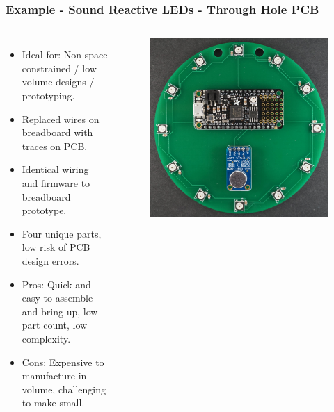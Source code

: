 \documentclass[aspectratio=169, t]{beamer}
\begin{document}
\begin{frame}
\frametitle{Example - Sound Reactive LEDs - Through Hole PCB}
\vspace{-5mm}
\begin{columns}
	\begin{itemize}
		\item Ideal for: Non space constrained / low volume designs / prototyping.
		\item Replaced wires on breadboard with traces on PCB.
		\item Identical wiring and firmware to breadboard prototype.
		\item Four unique parts, low risk of PCB design errors.
		\item Pros: Quick and easy to assemble and bring up, low part count, low complexity.
		\item Cons: Expensive to manufacture in volume, challenging to make small.
	\end{itemize}
	\begin{figure}
		\includegraphics[width=0.9\linewidth]{images/circle-feather.JPG}
	\end{figure}
\end{columns}
\end{frame}
\end{document}
